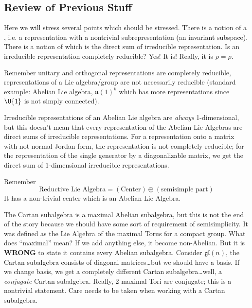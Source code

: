 \subsection{Review of Previous Stuff}
Here we will stress several points which should be
stressed. There is a notion of a , i.e. a representation with a nontrivial
subrepresentation (an invariant subspace). There is a notion of
 which is the direct
sum of irreducible representation. Is an irreducible
representation completely reducible? Yes! It is! Really, it is
$\rho=\rho$. 

Remember unitary and orthogonal representations are completely
reducible, representations of a Lie algebra/group are not
necessarily reducible (standard example: Abelian Lie algebra,
$\mathfrak{u}(1)^{k}$ which has more representations since
$\U{1}$ is not simply connected).

Irreducible representations of an Abelian Lie algebra are
\emph{always} 1-dimensional, but this doesn't mean that every
representation of the Abelian Lie Algebras are direct sums of
irreducible representations. For a representation onto a matrix
with not normal Jordan form, the representation is not completely
reducible; for the representation of the single generator by a
diagonalizable matrix, we get the direct sum of 1-dimensional
irreducible representations.

Remember
\begin{equation}
\mbox{Reductive Lie
  Algebra}=(\mbox{Center})\oplus(\mbox{semisimple part})
\end{equation}
It has a non-trivial center which is an Abelian Lie Algebra.

The Cartan subalgebra is a maximal Abelian subalgebra, but this
is not the end of the story because we should have some sort of
requirement of semisimplicity. It was defined as the Lie Algebra
of the maximal Torus for a compact group. What does ``maximal''
mean? If we add anything else, it become non-Abelian. But it is
\textbf{WRONG} to state it contains every Abelian
subalgebra. Consider $\mathfrak{gl}(n)$, the Cartan subalgebra
consists of diagonal matrices\dots but we should have a basis. If
we change basis, we get a completely different Cartan
subalgebra\dots well, a \emph{conjugate} Cartan
subalgebra. Really, 2 maximal Tori are conjugate; this is a
nontrivial statement. Care needs to be taken when working with a
Cartan subalgebra.

